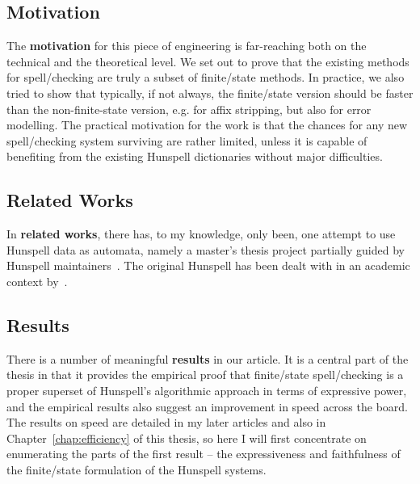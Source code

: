 \documentclass[officiallayout,final]{unihelcompling}
\begin{document}
\subsection{Motivation}

The \textbf{motivation} for this piece of engineering is far-reaching both on
the technical and the theoretical level. We set out to prove that the existing
methods for spell\-/checking are truly a subset of finite\-/state methods.  In
practice, we also tried to show that typically, if not always, the
finite\-/state version should be faster than the non-finite-state version, e.g.
for affix stripping, but also for error modelling. The practical motivation for
the work is that the chances for any new spell\-/checking system surviving are
rather limited, unless it is capable of benefiting from the existing Hunspell
dictionaries without major difficulties.

\subsection{Related Works}

In \textbf{related works}, there has, to my knowledge, only been, one attempt
to use Hunspell data as automata, namely a master's thesis project partially
guided by Hunspell maintainers~\citep{greenfield2010open}.
The
original Hunspell has been dealt with in an academic context 
by~\citet{tron2005hunmorph}.

\subsection{Results}

There is a number of meaningful \textbf{results} in our article. It is a
central part of the thesis in that it provides the empirical proof that
finite\-/state spell\-/checking is a proper superset of Hunspell's algorithmic
approach in terms of expressive power, and the empirical results also suggest
an improvement in speed across the board. The results on speed are detailed in
my later articles and also in Chapter~\ref{chap:efficiency} of this thesis, so
here I will first concentrate on enumerating the parts of the first
result -- the expressiveness and faithfulness of the finite\-/state formulation
of the Hunspell systems.
\end{document}
